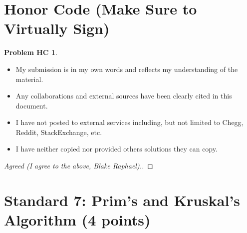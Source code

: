 \documentclass[11pt]{article}
\theoremstyle{definition}
\theoremstyle{definition}
\newtheorem*{requiredHC}{Problem HC}
\theoremstyle{definition}
\begin{document}
\newpage
\section*{Honor Code (Make Sure to Virtually Sign)} \label{HonorCode}
\hypertarget{HonorCode}{}

\begin{requiredHC}
\begin{itemize}
\item My submission is in my own words and reflects my understanding of the material.
\item Any collaborations and external sources have been clearly cited in this document.
\item I have not posted to external services including, but not limited to Chegg, Reddit, StackExchange, etc.
\item I have neither copied nor provided others solutions they can copy.
\end{itemize}

\end{requiredHC}

\begin{proof}[Agreed (I agree to the above, Blake Raphael).]
\end{proof}


\newpage
\setcounter{section}{6}
\section{Standard 7: Prim's and Kruskal's Algorithm (4 points)}
\end{document}
